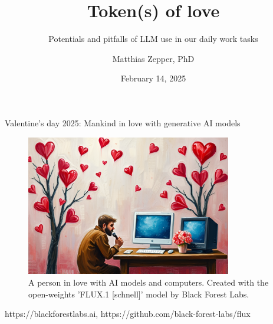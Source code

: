 \documentclass[10pt]{beamer}
\title{Token(s) of love}
\subtitle{Potentials and pitfalls of LLM use in our daily work tasks}
\date{February 14, 2025}
\author{Matthias Zepper, PhD}
\institute{NGI Stockholm, Genomic Focus Meeting}
\newcommand{\credit}[1]{{\par \raggedleft \scriptsize \mdseries \color{mDarkBrown} #1 \par}}
\begin{document}
\maketitle

\begin{frame}{Valentine's day 2025: Mankind in love with generative AI models}
\begin{figure}
	\includegraphics[width=0.8\textwidth]{figures/Valentine_s_Day_oil_painting_mathematic_matrices_formulas_and_computers.png}
	\caption{A person in love with AI models and computers. Created with the open-weights 'FLUX.1 [schnell]' model by Black Forest Labs.}
\end{figure}
\credit{https://blackforestlabs.ai, https://github.com/black-forest-labs/flux}
\vspace{2cm}
\cite{Blum2023}
\end{frame}
\end{document}

